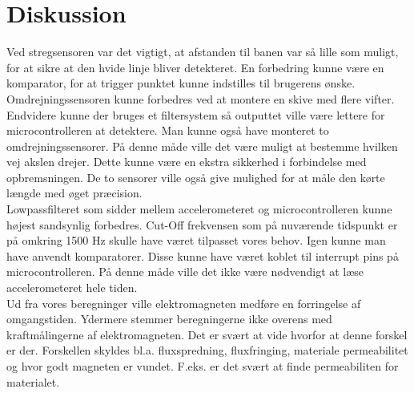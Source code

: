 \section{Diskussion}
Ved stregsensoren var det vigtigt, at afstanden til banen var så lille som muligt, for at sikre at den hvide linje bliver detekteret. En forbedring kunne være en komparator, for at trigger punktet kunne indstilles til brugerens ønske.\\
Omdrejningssensoren kunne forbedres ved at montere en skive med flere vifter. Endvidere kunne der bruges et filtersystem så outputtet ville være lettere for microcontrolleren at detektere. Man kunne også have monteret to omdrejningssensorer. På denne måde ville det være muligt at bestemme hvilken vej akslen drejer. Dette kunne være en ekstra sikkerhed i forbindelse med opbremsningen. De to sensorer ville også give mulighed for at måle den kørte længde med øget præcision.\\
Lowpassfilteret som sidder mellem accelerometeret og microcontrolleren kunne højest sandsynlig forbedres. Cut-Off frekvensen som på nuværende tidspunkt er på omkring 1500 Hz skulle have været tilpasset vores behov. Igen kunne man have anvendt komparatorer. Disse kunne have været koblet til interrupt pins på microcontrolleren. På denne måde ville det ikke være nødvendigt at læse accelerometeret hele tiden.\\
Ud fra vores beregninger ville elektromagneten medføre en forringelse af omgangstiden. Ydermere stemmer beregningerne ikke overens med kraftmålingerne af elektromagneten. Det er svært at vide hvorfor at denne forskel er der. Forskellen skyldes bl.a. fluxspredning, fluxfringing, materiale permeabilitet og hvor godt magneten er vundet. F.eks. er det svært at finde permeabiliten for materialet.\\

